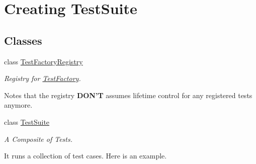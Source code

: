 \hypertarget{group___creating_test_suite}{\section{Creating Test\+Suite}
\label{group___creating_test_suite}
}
\subsection*{Classes}
\begin{DoxyCompactItemize}
\item 
class \hyperlink{class_test_factory_registry}{Test\+Factory\+Registry}
\begin{DoxyCompactList}\small\item\em Registry for \hyperlink{class_test_factory}{Test\+Factory}.

Notes that the registry {\bfseries D\+O\+N'T} assumes lifetime control for any registered tests anymore. \end{DoxyCompactList}\item 
class \hyperlink{class_test_suite}{Test\+Suite}
\begin{DoxyCompactList}\small\item\em A Composite of Tests.

It runs a collection of test cases. Here is an example. \end{DoxyCompactList}\end{DoxyCompactItemize}

